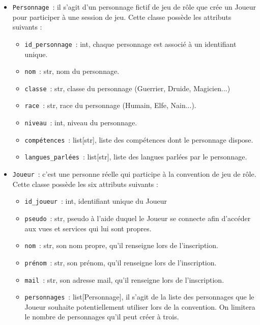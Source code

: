 \documentclass[11pt]{article}
\begin{document}
\begin{itemize}
    \item \texttt{Personnage}~: il s'agit d'un personnage fictif de jeu de rôle que crée un Joueur pour participer à une session de jeu. Cette classe possède les attributs suivants :
    \begin{itemize}[label=, font=\small]
        \item \texttt{id\_personnage}~: int, chaque personnage est associé à un identifiant unique.
        \item \texttt{nom}~: str, nom du personnage.
        \item \texttt{classe}~: str, classe du personnage (Guerrier, Druide, Magicien...)
        \item \texttt{race}~: str, race du personnage (Humain, Elfe, Nain...).
        \item \texttt{niveau}~: int, niveau du personnage.
        \item \texttt{compétences}~: list[str], liste des compétences dont le personnage dispose.
        \item \texttt{langues\_parlées}~: list[str], liste des langues parlées par le personnage.
    \end{itemize}

    \item \texttt{Joueur}~: c'est une personne réelle qui participe à la convention de jeu de rôle. Cette classe possède les six attributs suivants :
    \begin{itemize}[label=, font=\small]
        \item \texttt{id\_joueur}~: int, identifiant unique du Joueur
        \item \texttt{pseudo}~: str, pseudo à l'aide duquel le Joueur se connecte afin d'accéder aux vues et services qui lui sont propres.
        \item \texttt{nom}~: str, son nom propre, qu'il renseigne lors de l'inscription.
        \item \texttt{prénom}~: str, son prénom, qu'il renseigne lors de l'inscription.
        \item \texttt{mail}~: str, son adresse mail, qu'il renseigne lors de l'inscription.
        \item \texttt{personnages}~: list[Personnage], il s'agit de la liste des personnages que le Joueur souhaite potentiellement utiliser lors de la convention. On limitera le nombre de personnages qu'il peut créer à trois.
    \end{itemize}
\end{itemize}
\end{document}
